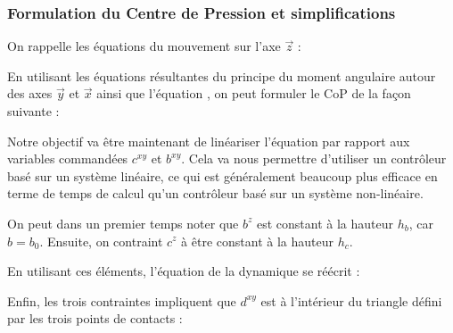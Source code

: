 			\subsubsection{Formulation du Centre de Pression et simplifications}
			
				On rappelle les équations du mouvement sur l'axe $\vec{z}$  :
			
				En utilisant les équations résultantes du principe du moment angulaire autour des axes $\vec{y}$ et $\vec{x}$  ainsi que l'équation , on peut formuler le CoP de la façon suivante :	
				
				Notre objectif va être maintenant de linéariser l'équation  par rapport aux variables commandées $c^{xy}$ et $b^{xy}$.
				Cela va nous permettre d'utiliser un contrôleur basé sur un système linéaire, ce qui est généralement beaucoup plus efficace en terme de temps de calcul qu'un contrôleur basé sur un système non-linéaire.
				
				On peut dans un premier temps noter que $b^z$ est constant à la hauteur $h_b$, car $b=b_0$. Ensuite, on contraint $c^z$ à être constant à la hauteur $h_c$.
				
				En utilisant ces éléments, l'équation de la dynamique  se réécrit :
				
				
				Enfin, les trois contraintes  impliquent que $d^{xy}$ est à l'intérieur du triangle défini par les trois points de contacts :
				

